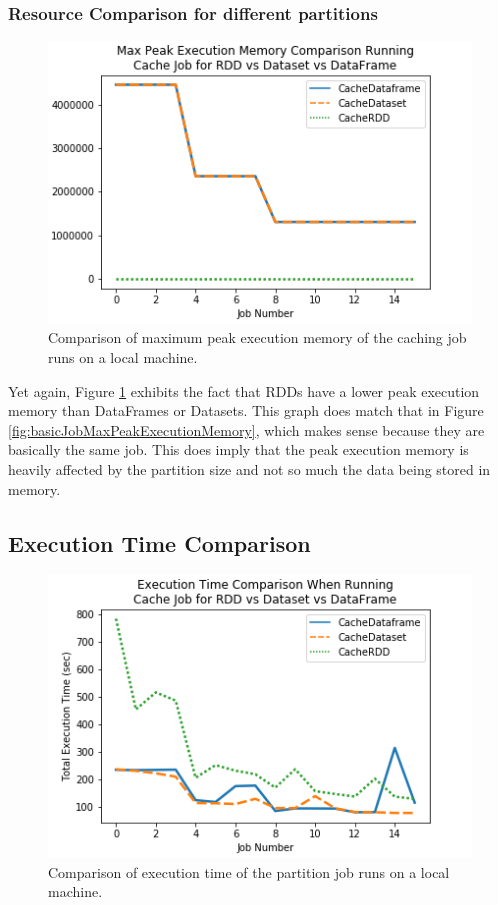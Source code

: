 \documentclass[conference]{IEEEtran}
\begin{document}
\subsubsection{Resource Comparison for different partitions}
\begin{figure}
    \includegraphics[width=\linewidth]{../python_scripts/images/cacheJobMaxPeakExecutionMemory.png}
    \caption{Comparison of maximum peak execution memory of the caching job runs on a local machine.}
    \label{fig:cacheJobMaxPeakExecutionMemory}
\end{figure}

Yet again, Figure \ref{fig:cacheJobMaxPeakExecutionMemory} exhibits the fact that RDDs have a lower peak execution memory than DataFrames or Datasets.
This graph does match that in Figure \ref{fig:basicJobMaxPeakExecutionMemory}, which makes sense because they are basically the same job.
This does imply that the peak execution memory is heavily affected by the partition size and not so much the data being stored in memory.

\subsection{Execution Time Comparison}
\begin{figure}
    \includegraphics[width=\linewidth]{../python_scripts/images/cacheJobAllExecutionTime.png}
    \caption{Comparison of execution time of the partition job runs on a local machine.}
    \label{fig:cacheJobAllExecutionTime}
\end{figure}
\end{document}
